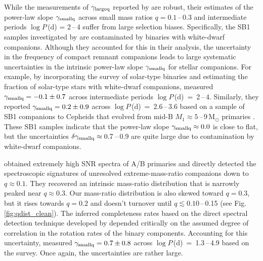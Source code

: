 \documentclass[a4paper,fleqn,usenatbib]{mnras}
\begin{document}
While the measurements of $\gamma_{\rm largeq}$ reported by \citet{moe&distefano2017} are robust, their estimates of the power-law slope $\gamma_{\rm smallq}$ across small mass ratios $q = 0.1$\,--\,0.3 and intermediate periods $\log P$\,(d) = 2\,--\,4 suffer from large selection biases. Specifically, the SB1 samples investigated by \citet{moe&distefano2017} are contaminated by binaries with white-dwarf companions. Although they accounted for this in their analysis, the uncertainty in the frequency of compact remnant companions leads to large systematic uncertainties in the intrinsic power-law slope $\gamma_{\rm smallq}$ for stellar companions. For example, by incorporating the \citet{raghavanetal2010} survey of solar-type binaries and estimating the fraction of solar-type stars with white-dwarf companions, \citet{moe&distefano2017} measured \mbox{$\gamma_{\rm smallq} = -0.1\pm0.7$} across intermediate periods \mbox{$\log P$\,(d) = 2\,--\,4}.  Similarly, they reported \mbox{$\gamma_{\rm smallq} = 0.2 \pm 0.9$} across \mbox{$\log P$\,(d) = 2.6\,--\,3.6} based on a sample of SB1 companions to Cepheids that evolved from mid-B $M_1 \approx 5$\,--\,9\,M$_{\odot}$ primaries \citep{evansetal2015}. These SB1 samples indicate that the power-law slope \mbox{$\gamma_{\rm smallq} \approx 0.0$} is close to flat, but the uncertainties \mbox{$\delta \gamma_{\rm smallq} \approx 0.7$\,--\,0.9} are quite large due to contamination by white-dwarf companions.  

\citet{gulliksonetal2016} obtained extremely high SNR spectra of A/B primaries and directly detected the spectroscopic signatures of unresolved extreme-mass-ratio companions down to $q \approx 0.1$.  They recovered an intrinsic mass-ratio distribution that is narrowly peaked near $q \approx 0.3$.  Our mass-ratio distribution is also skewed toward $q = 0.3$, but it rises towards $q = 0.2$ and doesn't turnover until \mbox{$q \lesssim 0.10$\,--\,0.15} (see Fig.\,\ref{fig:qdist_clean}).  The inferred completeness rates based on the direct spectral detection technique developed by \citet{gulliksonetal2016} depended critically on the assumed degree of correlation in the rotation rates of the binary components. Accounting for this uncertainty, \citet{moe&distefano2017} measured \mbox{$\gamma_{\rm smallq} = 0.7\pm0.8$} across \mbox{$\log P$\,(d) = 1.3\,--\,4.9} based on the \citet{gulliksonetal2016} survey. Once again, the uncertainties are rather large.
\end{document}
